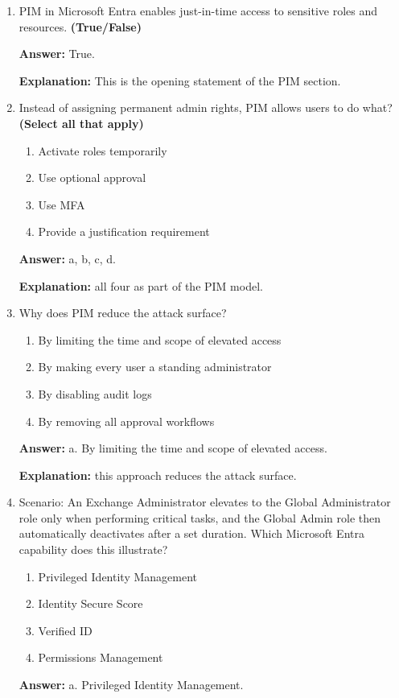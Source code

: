 \documentclass[10pt]{article}
\begin{document}
\begin{enumerate}[leftmargin=*]
\textbf{Explanation:} these changes lead to a 40-point increase in Secure Score.

\item PIM in Microsoft Entra enables just-in-time access to sensitive roles and resources. \textbf{(True/False)}

\textbf{Answer:} True.

\textbf{Explanation:} This is the opening statement of the PIM section.

\item Instead of assigning permanent admin rights, PIM allows users to do what? \textbf{(Select all that apply)}
\begin{enumerate}[label=\alph*., leftmargin=1.5em]
\item Activate roles temporarily
\item Use optional approval
\item Use MFA
\item Provide a justification requirement
\end{enumerate}
\textbf{Answer:} a, b, c, d.

\textbf{Explanation:} all four as part of the PIM model.

\item Why does PIM reduce the attack surface?
\begin{enumerate}[label=\alph*., leftmargin=1.5em]
\item By limiting the time and scope of elevated access
\item By making every user a standing administrator
\item By disabling audit logs
\item By removing all approval workflows
\end{enumerate}
\textbf{Answer:} a. By limiting the time and scope of elevated access.

\textbf{Explanation:} this approach reduces the attack surface.

\item Scenario: An Exchange Administrator elevates to the Global Administrator role only when performing critical tasks, and the Global Admin role then automatically deactivates after a set duration. Which Microsoft Entra capability does this illustrate?
\begin{enumerate}[label=\alph*., leftmargin=1.5em]
\item Privileged Identity Management
\item Identity Secure Score
\item Verified ID
\item Permissions Management
\end{enumerate}
\textbf{Answer:} a. Privileged Identity Management.


\end{enumerate}
\end{document}
